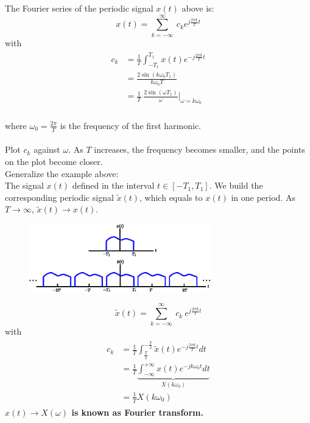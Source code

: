 \begin{ex}{}
    The Fourier series of the periodic signal $x(t)$ above is:
    \[ 
    x(t) =  \sum_{k=-\infty}^{\infty} \ c_{k} e^{j\frac{2\pi k}{T}t}
    \]
    with
    \begin{align*}
    \begin{split}
        c_{k} 
        &= \frac{1}{T} \int_{-T_{1}}^{T_{1}} x(t)e^{-j\frac{2\pi k}{T}t} \\
        &= \frac{2 \sin(k \omega_{0} T_{1})}{k \omega_{0} T} \\
        &=\frac{1}{T} \ \frac{2 \sin(\omega T_{1})}{\omega} \bigg\rvert_{\omega = k \omega_{0}} 
    \end{split} 
    \end{align*}\\
    where $\omega_{0}=\frac{2\pi}{T}$ is the frequency of the first harmonic.\\\\
    Plot $c_{k}$ against $\omega$. As $T$ increases, the frequency becomes smaller, and the points on the plot become closer.\\
    
    Generalize the example above:\\
    The signal $x(t)$ defined in the interval $t \in [-T_{1}, T_{1}]$. We build the corresponding periodic signal $\tilde{x}(t)$, which equals to $x(t)$ in one period. As $T \to \infty$, $\tilde{x}(t) \to x(t)$.
    \begin{figure}[H] 
        \centering 
        \includegraphics[width = 0.7\textwidth]{images/periodic_duplication.eps} 
    \end{figure}
    
    \[ 
        \tilde{x}(t) = \sum_{k=-\infty}^{\infty} \ c_{k} \ e^{j\frac{2\pi k}{T}t} 
    \]
    \quad with
    \begin{align*}
    \begin{split}
        c_{k} 
        &= \frac{1}{T} \int_{\frac{T}{2}}^{-\frac{T}{2}} \tilde{x}(t)e^{-j\frac{2\pi k}{T}t} dt \\
        &= \frac{1}{T} \underbrace{\int_{-\infty}^{+\infty} x(t)e^{-j k \omega_{0} t} dt}_{X(k\omega_{0})}\\
        &=\frac{1}{T} X(k\omega_{0}) 
    \end{split}
    \end{align*}
    \textbf{ $x(t) \to X(\omega)$ is known as Fourier transform.}
    

\end{ex}
